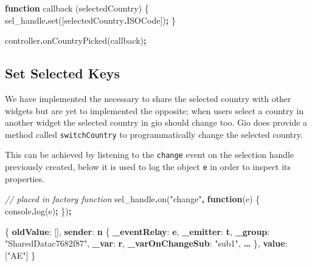 \documentclass[
]{krantz}
\makeatletter
\newenvironment{Shaded}{\begin{snugshade}}{\end{snugshade}}
\newcommand{\AttributeTok}[1]{\textcolor[rgb]{0.61,0.61,0.61}{#1}}
\newcommand{\BuiltInTok}[1]{#1}
\newcommand{\CommentTok}[1]{\textcolor[rgb]{0.37,0.37,0.37}{\textit{#1}}}
\newcommand{\ErrorTok}[1]{\textcolor[rgb]{0.14,0.14,0.14}{\textbf{#1}}}
\newcommand{\FunctionTok}[1]{\textcolor[rgb]{0,0,0}{#1}}
\newcommand{\KeywordTok}[1]{\textcolor[rgb]{0.27,0.27,0.27}{\textbf{#1}}}
\newcommand{\NormalTok}[1]{#1}
\newcommand{\OperatorTok}[1]{\textcolor[rgb]{0.43,0.43,0.43}{\textbf{#1}}}
\newcommand{\OtherTok}[1]{\textcolor[rgb]{0.37,0.37,0.37}{#1}}
\newcommand{\StringTok}[1]{\textcolor[rgb]{0.5,0.5,0.5}{#1}}
\newenvironment{kframe}{%
\medskip{}
\setlength{\fboxsep}{.8em}
 \def\at@end@of@kframe{}%
 \ifinner\ifhmode%
  \def\at@end@of@kframe{\end{minipage}}%
  \begin{minipage}{\columnwidth}%
 \fi\fi%
 \def\FrameCommand##1{\hskip\@totalleftmargin \hskip-\fboxsep
 \colorbox{shadecolor}{##1}\hskip-\fboxsep
     \hskip-\linewidth \hskip-\@totalleftmargin \hskip\columnwidth}%
 \MakeFramed {\advance\hsize-\width
   \@totalleftmargin\z@ \linewidth\hsize
   \@setminipage}}%
 {\par\unskip\endMakeFramed%
 \at@end@of@kframe}
\renewenvironment{Shaded}{\begin{kframe}}{\end{kframe}}
\makeatother
\begin{document}
\begin{Shaded}
\begin{Highlighting}[]
\KeywordTok{function} \FunctionTok{callback}\NormalTok{ (selectedCountry) \{}
\NormalTok{  sel\_handle}\OperatorTok{.}\FunctionTok{set}\NormalTok{([selectedCountry}\OperatorTok{.}\AttributeTok{ISOCode}\NormalTok{])}\OperatorTok{;}
\NormalTok{\}}

\NormalTok{controller}\OperatorTok{.}\FunctionTok{onCountryPicked}\NormalTok{(callback)}\OperatorTok{;}
\end{Highlighting}
\end{Shaded}

\hypertarget{linking-widgets-set-keys}{%
\subsection{Set Selected Keys}\label{linking-widgets-set-keys}}

We have implemented the necessary to share the selected country with other widgets but are yet to implemented the opposite; when users select a country in another widget the selected country in gio should change too. Gio does provide a method called \texttt{switchCountry} to programmatically change the selected country.

This can be achieved by listening to the \texttt{change} event on the selection handle previously created, below it is used to log the object \texttt{e} in order to inspect its properties.

\begin{Shaded}
\begin{Highlighting}[]
\CommentTok{// placed in factory function}
\NormalTok{sel\_handle}\OperatorTok{.}\FunctionTok{on}\NormalTok{(}\StringTok{"change"}\OperatorTok{,} \KeywordTok{function}\NormalTok{(e) \{}
  \BuiltInTok{console}\OperatorTok{.}\FunctionTok{log}\NormalTok{(e)}\OperatorTok{;}
\NormalTok{\})}\OperatorTok{;}
\end{Highlighting}
\end{Shaded}

\begin{Shaded}
\begin{Highlighting}[]
\FunctionTok{\{}
  \ErrorTok{oldValue}\FunctionTok{:} \OtherTok{[]}\FunctionTok{,}
  \ErrorTok{sender}\FunctionTok{:} \ErrorTok{n} \FunctionTok{\{}
    \ErrorTok{\_eventRelay}\FunctionTok{:} \ErrorTok{e}\FunctionTok{,} 
    \ErrorTok{\_emitter}\FunctionTok{:} \ErrorTok{t}\FunctionTok{,} 
    \ErrorTok{\_group}\FunctionTok{:} \StringTok{"SharedDatac7682f87"}\FunctionTok{,} 
    \ErrorTok{\_var}\FunctionTok{:} \ErrorTok{r}\FunctionTok{,} 
    \ErrorTok{\_varOnChangeSub}\FunctionTok{:} \StringTok{"sub1"}\FunctionTok{,} 
    \ErrorTok{…}
  \FunctionTok{\},}
  \ErrorTok{value}\FunctionTok{:} \OtherTok{[}\StringTok{"AE"}\OtherTok{]}
\FunctionTok{\}}
\end{Highlighting}
\end{Shaded}
\end{document}
